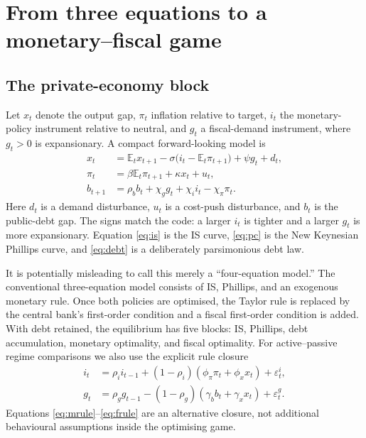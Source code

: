 \documentclass[11pt]{article}
\newcommand{\E}{\mathbb{E}}
\begin{document}
\section{From three equations to a monetary--fiscal game}

\subsection{The private-economy block}

Let $x_t$ denote the output gap, $\pi_t$ inflation relative to target, $i_t$
the monetary-policy instrument relative to neutral, and $g_t$ a fiscal-demand
instrument, where $g_t>0$ is expansionary.  A compact forward-looking model is
\begin{align}
 x_t &= \E_t x_{t+1}
       - \sigma\bigl(i_t-\E_t\pi_{t+1}\bigr)
       + \psi g_t + d_t,                                      \label{eq:is}\\
 \pi_t &= \beta\E_t\pi_{t+1}+\kappa x_t+u_t,                  \label{eq:pc}\\
 b_{t+1} &= \rho_b b_t+\chi_g g_t+\chi_i i_t-\chi_\pi\pi_t . \label{eq:debt}
\end{align}
Here $d_t$ is a demand disturbance, $u_t$ is a cost-push disturbance, and
$b_t$ is the public-debt gap.  The signs match the code: a larger $i_t$ is
tighter and a larger $g_t$ is more expansionary.  Equation \eqref{eq:is} is the
IS curve, \eqref{eq:pc} is the New Keynesian Phillips curve, and
\eqref{eq:debt} is a deliberately parsimonious debt law.

It is potentially misleading to call this merely a ``four-equation model.''
The conventional three-equation model consists of IS, Phillips, and an
exogenous monetary rule.  Once both policies are optimised, the Taylor rule is
replaced by the central bank's first-order condition and a fiscal first-order
condition is added.  With debt retained, the equilibrium has five blocks:
IS, Phillips, debt accumulation, monetary optimality, and fiscal optimality.
For active--passive regime comparisons we also use the explicit rule closure
\begin{align}
 i_t &= \rho_i i_{t-1}+(1-\rho_i)(\phi_\pi\pi_t+\phi_xx_t)+\varepsilon^i_t,
                                                                  \label{eq:mrule}\\
 g_t &= \rho_g g_{t-1}-(1-\rho_g)(\gamma_bb_t+\gamma_xx_t)+\varepsilon^g_t.
                                                                  \label{eq:frule}
\end{align}
Equations \eqref{eq:mrule}--\eqref{eq:frule} are an alternative closure, not
additional behavioural assumptions inside the optimising game.
\end{document}
